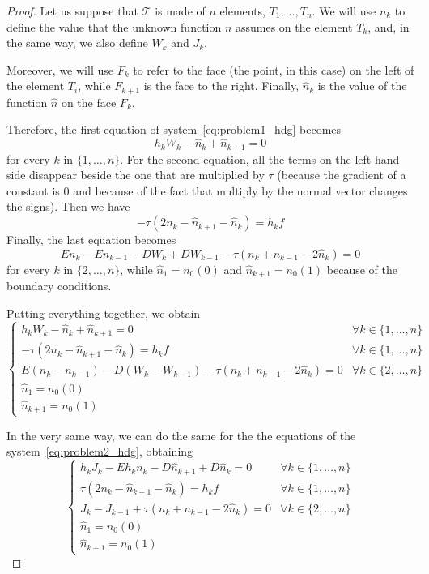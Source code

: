 \documentclass[a4paper,11pt, draft]{article}
\begin{document}
\begin{proof}
 Let us suppose that $\mathcal{T}$ is made of $n$ elements, $T_1, \ldots, T_n$. We will use $n_k$ 
to define the value that the unknown function $n$ assumes on the element $T_k$, and, in the same 
way, we also define $W_k$ and $J_k$.

Moreover, we will use $F_k$ to refer to the face (the point, in this case) on the left of the 
element $T_i$, while $F_{k+1}$ is the face to the right. Finally, $\widehat{n}_k$ is the value of 
the function $\widehat{n}$ on the face $F_k$.

Therefore, the first equation of system~\ref{eq:problem1_hdg} becomes
\[ h_k W_k - \widehat{n}_k + \widehat{n}_{k + 1} = 0 \]
for every $k$ in $\{1, \ldots, n\}$. For the second equation, all the terms on the left hand side 
disappear beside the one that are multiplied by $\tau$ (because the gradient of a constant is 0 and 
because of the fact that multiply by the normal vector changes the signs). Then we have
\[ - \tau (2 n_k - \widehat{n}_{k+1} - \widehat{n}_k) = h_k f \]
Finally, the last equation becomes
\[
  E n_{k} - E n_{k - 1} - D W_{k} + D W_{k - 1} - \tau (n_k + n_{k - 1} - 2\widehat{n}_k) = 0
\]
for every $k$ in $\{2, \ldots, n \}$, while $\widehat{n}_1 = n_0(0)$ and $\widehat{n}_{k + 1} = 
n_0(1)$ because of the boundary conditions.

Putting everything together, we obtain
\begin{equation}\label{eq:problem1_system}
 \begin{cases}
  \displaystyle h_k W_k - \widehat{n}_k + \widehat{n}_{k + 1} = 0  & \forall k \in \{1, 
\ldots, n\} \\
  \displaystyle -\tau (2 n_k - \widehat{n}_{k+1} - \widehat{n}_k) = h_k f & \forall k \in 
\{1, \ldots, n\} \\
  E (n_{k} \! - \! n_{k - 1}) - D (W_{k} \! - \! W_{k - 1}) - \tau (n_k \! +\! n_{k - 1} \! - \! 
2\widehat{n}_k) = 0 & \forall k \in \{2, \ldots, n\} \\
 \widehat{n}_1 = n_0(0) \\
 \widehat{n}_{k+1} = n_0(1)
 \end{cases}
\end{equation}

In the very same way, we can do the same for the the equations of the system~\ref{eq:problem2_hdg}, 
obtaining
\begin{equation}\label{eq:problem2_system}
 \begin{cases}
  h_k J_k - E h_k n_k - D \widehat{n}_{k + 1} + D \widehat{n}_{k} = 0 & \forall k \in \{1,\ldots, 
n\} \\
  \tau (2 n_k - \widehat{n}_{k + 1} - \widehat{n}_{k}) = h_k f & \forall k \in \{1,\ldots, n\} \\
  J_k - J_{k - 1} + \tau (n_k  + n_{k - 1} - 2\widehat{n}_k ) = 0 & \forall k \in \{2,\ldots, n\} \\
 \widehat{n}_1 = n_0(0) \\
 \widehat{n}_{k+1} = n_0(1)
 \end{cases}
\end{equation}


\end{proof}
\end{document}
